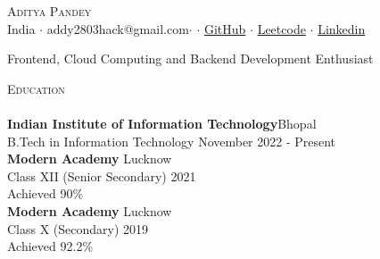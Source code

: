 \documentclass[a4paper]{article}
\newcommand{\lineunder} {
    \vspace*{-8pt} \\
    \hspace*{-18pt} \hrulefill \\
}
\newcommand{\header} [1] {
    {\hspace*{-18pt}\vspace*{6pt} \textsc{#1}}
    \vspace*{-6pt} \lineunder
}
\begin{document}
\vspace*{-40pt}

    

\vspace*{-9pt}
\begin{center}
	{\Huge \scshape {Aditya Pandey}}\\
	\vspace{2mm}
	India $\cdot$ addy2803hack@gmail.com$\cdot$  $\cdot$ \href{https://github.com/addyhacke}{GitHub} $\cdot$ 
 \href{https://leetcode.com/u/addy28hack/}{Leetcode} $\cdot$ \href{https://www.linkedin.com/in/aditya-pandey-5a2b7424a/}{Linkedin} \\
\end{center}

\begin{center}
Frontend, Cloud Computing and Backend Development Enthusiast\\
\end{center}

\header{Education}
\vspace{0mm}
\textbf{Indian Institute of Information Technology}\hfill Bhopal\\
B.Tech in Information Technology \hfill November 2022 - Present\\
\vspace{2mm}
\textbf{Modern Academy} \hfill Lucknow\\
Class XII (Senior Secondary) \hfill 2021\\
Achieved 90\%\\
\vspace{2mm}
\textbf{Modern Academy} \hfill Lucknow\\
Class X (Secondary) \hfill 2019\\
Achieved 92.2\%
\vspace{5mm}
 

\end{document}
